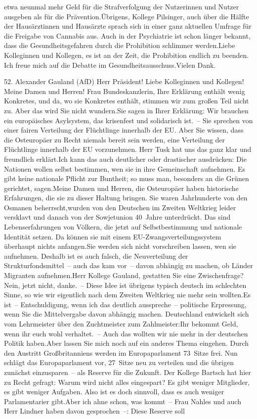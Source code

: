 \documentclass{article}
\begin{document}
etwa neunmal mehr Geld für die Strafverfolgung der Nutzerinnen und Nutzer ausgeben als für die Prävention.Übrigens, Kollege Pilsinger, auch über die Hälfte der Hausärztinnen und Hausärzte sprach sich in einer ganz aktuellen Umfrage für die Freigabe von Cannabis aus. Auch in der Psychiatrie ist schon länger bekannt, dass die Gesundheitsgefahren durch die Prohibition schlimmer werden.Liebe Kolleginnen und Kollegen, es ist an der Zeit, die Prohibition endlich zu beenden. Ich freue mich auf die Debatte im Gesundheitsausschuss.Vielen Dank.




	52. Alexander Gauland (AfD) Herr Präsident! Liebe Kolleginnen und Kollegen! Meine Damen und Herren! Frau Bundeskanzlerin, Ihre Erklärung enthält wenig Konkretes, und da, wo sie Konkretes enthält, stimmen wir zum großen Teil nicht zu. Aber das wird Sie nicht wundern.Sie sagen in Ihrer Erklärung: Wir brauchen ein europäisches Asylsystem, das krisenfest und solidarisch ist. – Sie sprechen von einer fairen Verteilung der Flüchtlinge innerhalb der EU. Aber Sie wissen, dass die Osteuropäer zu Recht niemals bereit sein werden, eine Verteilung der Flüchtlinge innerhalb der EU vorzunehmen. Herr Tusk hat uns das ganz klar und freundlich erklärt.Ich kann das auch deutlicher oder drastischer ausdrücken: Die Nationen wollen selbst bestimmen, wen sie in ihre Gemeinschaft aufnehmen. Es gibt keine nationale Pflicht zur Buntheit; so muss man, besonders an die Grünen gerichtet, sagen.Meine Damen und Herren, die Osteuropäer haben historische Erfahrungen, die sie zu dieser Haltung bringen. Sie waren Jahrhunderte von den Osmanen beherrscht,wurden von den Deutschen im Zweiten Weltkrieg leider versklavt und danach von der Sowjetunion 40 Jahre unterdrückt. Das sind Lebenserfahrungen von Völkern, die jetzt auf Selbstbestimmung und nationale Identität setzen. Da können sie mit einem EU-Zwangsverteilungssystem überhaupt nichts anfangen.Sie werden sich nicht vorschreiben lassen, wen sie aufnehmen. Deshalb ist es auch falsch, die Neuverteilung der Strukturfondsmittel – auch das kam vor – davon abhängig zu machen, ob Länder Migranten aufnehmen.Herr Kollege Gauland, gestatten Sie eine Zwischenfrage?Nein, jetzt nicht, danke. – Diese Idee ist übrigens typisch deutsch im schlechten Sinne, so wie wir eigentlich nach dem Zweiten Weltkrieg nie mehr sein wollten.Es ist – Entschuldigung, wenn ich das deutlich ausspreche – politische Erpressung, wenn Sie die Mittelvergabe davon abhängig machen. Deutschland entwickelt sich vom Lehrmeister über den Zuchtmeister zum Zahlmeister:Ihr bekommt Geld, wenn ihr euch wohl verhaltet. – Auch das wollten wir nie mehr in der deutschen Politik haben.Aber lassen Sie mich noch auf ein anderes Thema eingehen. Durch den Austritt Großbritanniens werden im Europaparlament 73 Sitze frei. Nun schlägt das Europaparlament vor, 27 Sitze neu zu verteilen und die übrigen zunächst einzusparen – als Reserve für die Zukunft. Der Kollege Bartsch hat hier zu Recht gefragt: Warum wird nicht alles eingespart? Es gibt weniger Mitglieder, es gibt weniger Aufgaben. Also ist es doch sinnvoll, dass es auch weniger Parlamentarier gibt.Aber ich ahne schon, was kommt – Frau Nahles und auch Herr Lindner haben davon gesprochen –: Diese Reserve soll 
\end{document}

